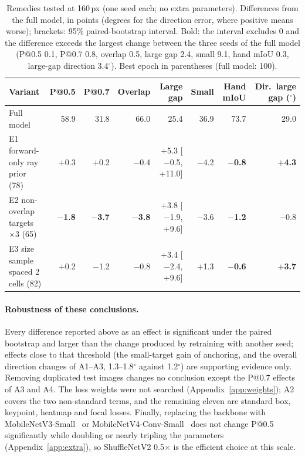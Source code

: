 \begin{table}[t]
  \caption{Remedies tested at 160\,px (one seed each; no extra parameters). Differences from the full model, in points (degrees for the direction error, where positive means worse); brackets: 95\% paired-bootstrap interval. Bold: the interval excludes 0 and the difference exceeds the largest change between the three seeds of the full model (P@0.5 0.1, P@0.7 0.8, overlap 0.5, large gap 2.4, small 9.1, hand mIoU 0.3, large-gap direction 3.4$^\circ$). Best epoch in parentheses (full model: 100).}
  \label{tab:remedies}
  \footnotesize
  \setlength{\tabcolsep}{2.5pt}
  \begin{tabular}{lrrrrrrr}
    \toprule
    Variant & P@0.5 & P@0.7 & Overlap & Large gap & Small & Hand mIoU & Dir.\ large gap ($^\circ$) \\
    \midrule
    Full model & 58.9 & 31.8 & 66.0 & 25.4 & 36.9 & 73.7 & 29.0 \\
    \midrule
    E1 forward-only ray prior (78) & $+$0.3 & $+$0.2 & $-$0.4 & $+$5.3 {\scriptsize[$-$0.5, +11.0]} & $-$4.2 & \textbf{$-$0.8} & \textbf{$+$4.3} \\
    E2 non-overlap targets $\times3$ (65) & \textbf{$-$1.8} & \textbf{$-$3.7} & \textbf{$-$3.8} & $+$3.8 {\scriptsize[$-$1.9, +9.6]} & $-$3.6 & \textbf{$-$1.2} & $-$0.8 \\
    E3 size sample spaced 2 cells (82) & $+$0.2 & $-$1.2 & $-$0.8 & $+$3.4 {\scriptsize[$-$2.4, +9.6]} & $+$1.3 & \textbf{$-$0.6} & \textbf{$+$3.7} \\
    \bottomrule
  \end{tabular}
\end{table}

\paragraph{Robustness of these conclusions.} Every difference reported above as an effect is significant under the paired bootstrap and larger than the change produced by retraining with another seed; effects close to that threshold (the small-target gain of anchoring, and the overall direction changes of A1--A3, 1.3--1.8$^\circ$ against 1.2$^\circ$) are supporting evidence only. Removing duplicated test images changes no conclusion except the P@0.7 effects of A3 and A4. The loss weights were not searched (Appendix~\ref{app:weights}); A2 covers the two non-standard terms, and the remaining eleven are standard box, keypoint, heatmap and focal losses. Finally, replacing the backbone with MobileNetV3-Small~\cite{howard2019mobilenetv3} or MobileNetV4-Conv-Small~\cite{qin2024mobilenetv4} does not change P@0.5 significantly while doubling or nearly tripling the parameters (Appendix~\ref{app:extra}), so ShuffleNetV2 0.5$\times$ is the efficient choice at this scale.

